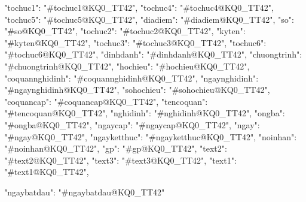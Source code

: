 {
                "tochuc1": "#tochuc1@KQ0_TT42",
                "tochuc4": "#tochuc4@KQ0_TT42",
                "tochuc5": "#tochuc5@KQ0_TT42",
                "diadiem": "#diadiem@KQ0_TT42",
                "so": "#so@KQ0_TT42",
                "tochuc2": "#tochuc2@KQ0_TT42",
                "kyten": "#kyten@KQ0_TT42",
                "tochuc3": "#tochuc3@KQ0_TT42",
                "tochuc6": "#tochuc6@KQ0_TT42",
                "dinhdanh": "#dinhdanh@KQ0_TT42",
                "chuongtrinh": "#chuongtrinh@KQ0_TT42",
                "hochieu": "#hochieu@KQ0_TT42",
                "coquannghidinh": "#coquannghidinh@KQ0_TT42",
                "ngaynghidinh": "#ngaynghidinh@KQ0_TT42",
                "sohochieu": "#sohochieu@KQ0_TT42",
                "coquancap": "#coquancap@KQ0_TT42",
                "tencoquan": "#tencoquan@KQ0_TT42",
                "nghidinh": "#nghidinh@KQ0_TT42",
                "ongba": "#ongba@KQ0_TT42",
                "ngaycap": "#ngaycap@KQ0_TT42",
                "ngay": "#ngay@KQ0_TT42",
                "ngayketthuc": "#ngayketthuc@KQ0_TT42",
                "noinhan": "#noinhan@KQ0_TT42",
                "gp": "#gp@KQ0_TT42",
                "text2": "#text2@KQ0_TT42",
                "text3": "#text3@KQ0_TT42",
                "text1": "#text1@KQ0_TT42",

                "ngaybatdau": "#ngaybatdau@KQ0_TT42"
            }